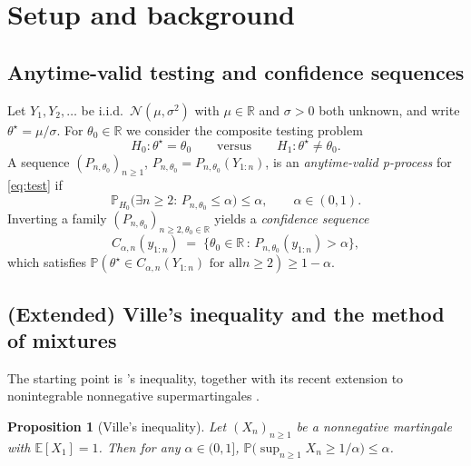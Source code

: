 \documentclass{article}%
\newtheorem{proposition}[theorem]{Proposition}
\newcommand{\R}{\mathbb{R}}
\newcommand{\E}{\mathbb{E}}
\newcommand{\Prob}{\mathbb{P}}
\begin{document}
\section{Setup and background}\label{sec:setup}

\subsection{Anytime-valid testing and confidence sequences}

Let \(Y_1,Y_2,\ldots\) be i.i.d.\ \(\mathcal N(\mu,\sigma^2)\) with
\(\mu\in\R\) and \(\sigma>0\) both unknown, and write
\(\theta^\star=\mu/\sigma\). For \(\theta_0\in\R\) we consider the
composite testing problem
\begin{equation}\label{eq:test}
   H_0\!:\theta^\star=\theta_0 \qquad\text{versus}\qquad
   H_1\!:\theta^\star\neq\theta_0.
\end{equation}
A sequence \((P_{n,\theta_0})_{n\geq 1}\), \(P_{n,\theta_0}=
P_{n,\theta_0}(Y_{1:n})\), is an \emph{anytime-valid p-process} for
\eqref{eq:test} if
\begin{equation}\label{eq:p-process}
   \Prob_{H_0}\!\bigl(\exists n\geq 2:\, P_{n,\theta_0}\leq \alpha\bigr)
   \leq \alpha,\qquad \alpha\in(0,1).
\end{equation}
Inverting a family \((P_{n,\theta_0})_{n\geq 2,\theta_0\in\R}\) yields
a \emph{confidence sequence}
\begin{equation}\label{eq:CS-from-pproc}
   C_{\alpha,n}(y_{1:n})
   \;=\;\bigl\{\theta_0\in\R\,:\,P_{n,\theta_0}(y_{1:n})>\alpha\bigr\},
\end{equation}
which satisfies
\(\Prob(\theta^\star\in C_{\alpha,n}(Y_{1:n})\text{ for all
}n\geq 2)\geq 1-\alpha\).


\subsection{(Extended) Ville's inequality and the method of mixtures}

The starting point is \cite{ville1939etude}'s inequality, together with its recent extension to nonintegrable nonnegative supermartingales
\citep{wang2025extended}.

\begin{proposition}[Ville's inequality]\label{prop:ville}
Let \((X_n)_{n\geq 1}\) be a nonnegative martingale with
\(\E[X_1]=1\). Then for any \(\alpha\in(0,1]\),
\(\Prob\bigl(\sup_{n\geq 1} X_n\geq 1/\alpha\bigr)\leq\alpha\).
\end{proposition}
\end{document}
